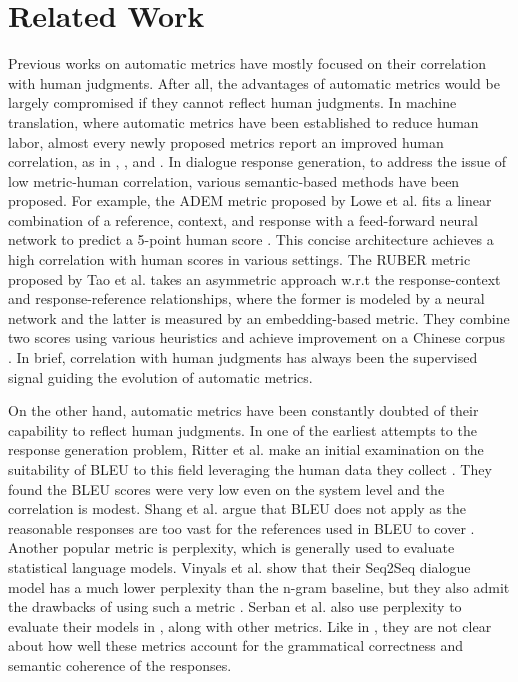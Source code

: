 \documentclass[runningheads]{llncs}
\begin{document}
    \section{Related Work}
    Previous works on automatic metrics have mostly focused on their correlation with human judgments. After all, the advantages of automatic metrics would be largely compromised if they cannot reflect human judgments. In machine translation, where automatic metrics have been established to reduce human labor, almost every newly proposed metrics report an improved human correlation, as in \cite{NIST}, \cite{METEOR}, and \cite{chrf}. In dialogue response generation, to address the issue of low metric-human correlation, various semantic-based methods have been proposed. For example, the ADEM metric proposed by Lowe et al. fits a linear combination of a reference, context, and response with a feed-forward neural network to predict a 5-point human score \cite{ADEM}. This concise architecture achieves a high correlation with human scores in various settings. The RUBER metric proposed by Tao et al. takes an asymmetric approach w.r.t the response-context and response-reference relationships, where the former is modeled by a neural network and the latter is measured by an embedding-based metric. They combine two scores using various heuristics and achieve improvement on a Chinese corpus \cite{RUBER}. In brief, correlation with human judgments has always been the supervised signal guiding the evolution of automatic metrics.

    On the other hand, automatic metrics have been constantly doubted of their capability to reflect human judgments. In one of the earliest attempts to the response generation problem, Ritter et al. make an initial examination on the suitability of BLEU to this field leveraging the human data they collect \cite{Ritter11}. They found the BLEU scores were very low even on the system level and the correlation is modest. Shang et al. argue that BLEU does not apply as the reasonable responses are too vast for the references used in BLEU to cover \cite{Shang}. Another popular metric is perplexity, which is generally used to evaluate statistical language models. Vinyals et al. show that their Seq2Seq dialogue model has a much lower perplexity than the n-gram baseline, but they also admit the drawbacks of using such a metric \cite{GoogleChatbot}. Serban et al. also use perplexity to evaluate their models in \cite{HRED}, along with other metrics. Like in \cite{GoogleChatbot}, they are not clear about how well these metrics account for the grammatical correctness and semantic coherence of the responses.
\end{document}
